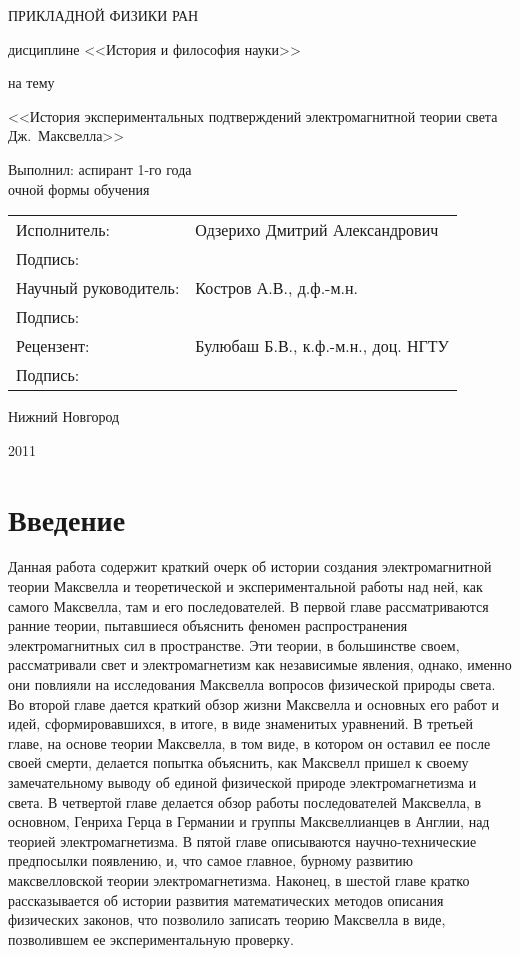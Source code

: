 \documentclass[12pt, oneside, a4paper]{article}
\begin{document}
\begin{titlepage}
\centerline{\large{} ПРИКЛАДНОЙ ФИЗИКИ РАН}
\vspace{3.0cm}
\centerline{\large{}}
\vspace{0.2cm}
\centerline{ дисциплине <<История и философия науки>>}
\vspace{0.3cm}
\centerline{на тему}
\vspace{0.2cm}
\begin{center}
\large
<<История экспериментальных подтверждений электромагнитной теории света Дж.~Максвелла>>
\vspace{1.0cm}
\begin{flushright}
\normalsize
Выполнил: аспирант 1-го года\\очной формы обучения 
\end{flushright}
\normalsize
\begin{flushright}
\begin{tabular}{>{\flushright}p{3.0cm}>{\flushleft}p{7.0cm}}

Исполнитель: & Одзерихо Дмитрий Александрович\tabularnewline
Подпись: &\tabularnewline
Научный руководитель: & Костров А.В., д.ф.-м.н.\tabularnewline
Подпись: &\tabularnewline
Рецензент: & Булюбаш Б.В., к.ф.-м.н., доц. НГТУ\tabularnewline
Подпись: &\tabularnewline
\end{tabular}
\end{flushright}
\vfill
\centerline{Нижний Новгород}
\centerline{2011}
\end{center}
\end{titlepage}
\tableofcontents
\newpage
\section{Введение}
Данная работа содержит краткий очерк об истории создания электромагнитной теории Максвелла и теоретической и экспериментальной работы над ней, как самого Максвелла, там и его последователей. В первой главе рассматриваются ранние теории, пытавшиеся объяснить феномен распространения электромагнитных сил в пространстве. Эти теории, в большинстве своем, рассматривали свет и электромагнетизм как независимые явления, однако, именно они повлияли на исследования Максвелла вопросов физической природы света. Во второй главе дается краткий обзор жизни Максвелла и основных его работ и идей, сформировавшихся, в итоге, в виде знаменитых уравнений. В третьей главе, на основе теории Максвелла, в том виде, в котором он оставил ее после своей смерти, делается попытка объяснить, как Максвелл пришел к своему замечательному выводу об единой физической природе электромагнетизма и света. В четвертой главе делается обзор работы последователей Максвелла, в основном, Генриха Герца в Германии и группы Максвеллианцев в Англии, над теорией электромагнетизма. В пятой главе описываются научно-технические предпосылки появлению, и, что самое главное, бурному развитию максвелловской теории электромагнетизма. Наконец, в шестой главе кратко  рассказывается об истории развития математических методов описания физических законов, что позволило записать теорию Максвелла в виде, позволившем ее экспериментальную проверку.
\end{document}
